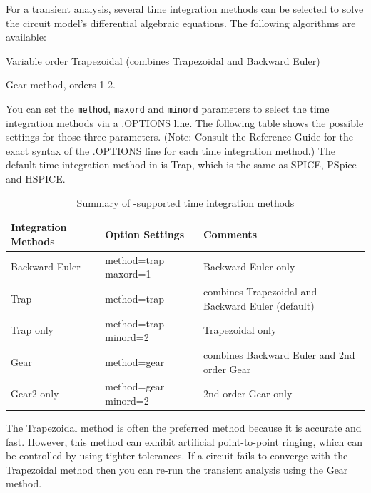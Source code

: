 For a transient analysis, several time integration methods can be
selected to solve the circuit model's differential algebraic
equations.  The following algorithms are available:

\begin{XyceItemize}
\item Variable order Trapezoidal (combines Trapezoidal and Backward Euler) 
\item Gear method, orders 1-2.
\end{XyceItemize}




You can set the \verb|method|, \verb|maxord| and \verb|minord|
parameters to select the time integration methods via a .OPTIONS
line. The following table shows the possible settings for those three
parameters. (Note: Consult the \Xyce{} Reference Guide\ReferenceGuide
for the exact syntax of the .OPTIONS line for each time integration
method.) The default time integration method in \Xyce{} is Trap, which
is the same as SPICE, PSpice and HSPICE.

\begin{table}[htbp]
  \caption{Summary of \Xyce{}-supported time integration methods \label{Time_integration}}
  \begin{tabularx}{\linewidth}{|Y|Y|Y|}
     \color{white}\bf  Integration Methods &
    \color{white}\bf  Option Settings & \color{white}\bf Comments \\ \hline
    Backward-Euler & method=trap maxord=1 & Backward-Euler only \\ \hline
    Trap & method=trap & combines Trapezoidal and Backward Euler (default) \\ \hline
    Trap only & method=trap minord=2 & Trapezoidal only \\ \hline
    Gear &  method=gear &  combines Backward Euler and 2nd order Gear \\ \hline
    Gear2 only &  method=gear minord=2 & 2nd order Gear only  \\ \hline
  \end{tabularx}
  
\end{table}



The Trapezoidal method is often the preferred method because it is
accurate and fast.  However, this method can exhibit artificial
point-to-point ringing, which can be controlled by using tighter
tolerances. If a circuit fails to converge with the Trapezoidal method
then you can re-run the transient analysis using the Gear method.

